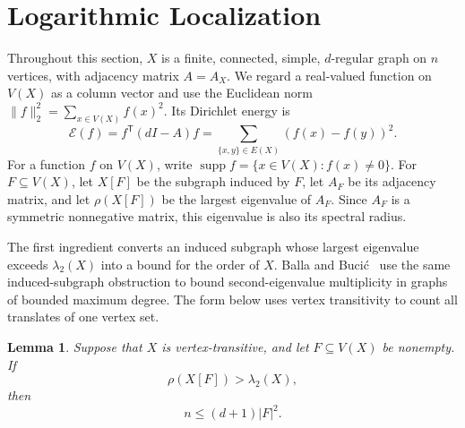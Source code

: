 \documentclass[11pt]{article}
\newtheorem{lemma}[theorem]{Lemma}
\theoremstyle{definition}
\theoremstyle{remark}
\begin{document}
\section{Logarithmic Localization}\label{sec:logarithmic-localization}

Throughout this section, $X$ is a finite, connected, simple, $d$-regular graph on $n$ vertices, with adjacency matrix $A=A_X$. We regard a real-valued function on $V(X)$ as a column vector and use the Euclidean norm $\|f\|_2^2=\sum_{x\in V(X)}f(x)^2$. Its Dirichlet energy is
\[
\mathcal E(f)=f^{\mathsf T}(dI-A)f=\sum_{\{x,y\}\in E(X)}(f(x)-f(y))^2.
\]
For a function $f$ on $V(X)$, write $\operatorname{supp}f=\{x\in V(X):f(x)\neq0\}$. For $F\subseteq V(X)$, let $X[F]$ be the subgraph induced by $F$, let $A_F$ be its adjacency matrix, and let $\rho(X[F])$ be the largest eigenvalue of $A_F$. Since $A_F$ is a symmetric nonnegative matrix, this eigenvalue is also its spectral radius.

The first ingredient converts an induced subgraph whose largest eigenvalue exceeds $\lambda_2(X)$ into a bound for the order of $X$. Balla and Buci\'c~\cite[Lemmas~2.2 and~2.3]{BallaBucic2024ImprovedMultiplicity} use the same induced-subgraph obstruction to bound second-eigenvalue multiplicity in graphs of bounded maximum degree. The form below uses vertex transitivity to count all translates of one vertex set.

\begin{lemma}\label{lem:induced-subgraph-count}
Suppose that $X$ is vertex-transitive, and let $F\subseteq V(X)$ be nonempty. If
\[
\rho(X[F])>\lambda_2(X),
\]
then
\[
n\leq(d+1)|F|^2.
\]
\end{lemma}
\end{document}
